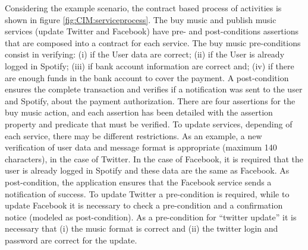 
\begin{example}\label{ex:toPublicMusic3}
Considering the example scenario, the contract based process of activities  is shown in figure \ref{fig:CIM:serviceprocess}. The buy music and publish music services (update Twitter and Facebook) have pre- and post-conditions assertions that are composed into a contract for each service. The buy music pre-conditions consist in verifying: 
(i) if the User data are correct; 
(ii) if the User is already logged in Spotify; 
(iii) if bank account information are correct and; 
(iv) if there are enough funds in the bank account to cover the payment. 
A post-condition ensures the complete transaction and verifies if a notification was sent to the user and Spotify, about the payment authorization. There are four assertions for the buy music action, and each assertion has been detailed with the assertion property and predicate that must be verified. To update services, depending of each service, there may be different restrictions. As an example, a new verification of user data and message format is appropriate (maximum 140 characters), in the case of Twitter. In the case of Facebook, it is required that the user is already logged in Spotify and these data are the same as Facebook. 
As post-condition, the application ensures that the Facebook service sends a notification of success. 
To update Twitter a pre-condition is required, while to update Facebook it is necessary to check a pre-condition and a confirmation notice (modeled as post-condition). 
As a pre-condition for ``twitter update'' it is necessary that (i) the music format is correct and (ii) the twitter login and password are correct for the update.
\end{example}


